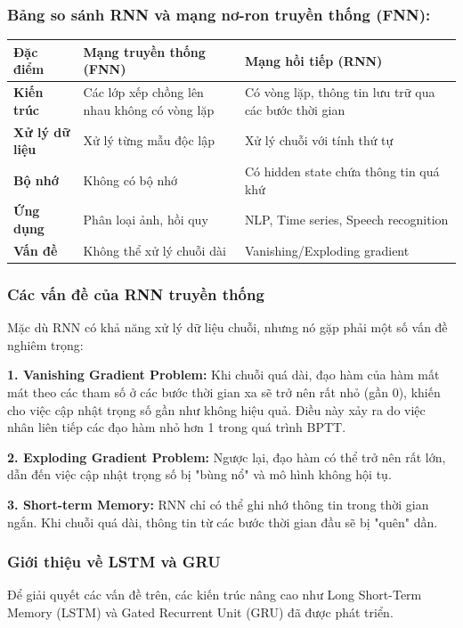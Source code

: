 \subsubsection{Bảng so sánh RNN và mạng nơ-ron truyền thống (FNN):}

\begin{table}[H]
    \centering
    \begin{tabular}{|p{3cm}|p{5.5cm}|p{5.5cm}|}
        \hline
        \textbf{Đặc điểm} & \textbf{Mạng truyền thống (FNN)} & \textbf{Mạng hồi tiếp (RNN)} \\ \hline        \textbf{Kiến trúc} & Các lớp xếp chồng lên nhau không có vòng lặp & Có vòng lặp, thông tin lưu trữ qua các bước thời gian \\ \hline
        \textbf{Xử lý dữ liệu} & Xử lý từng mẫu độc lập & Xử lý chuỗi với tính thứ tự \\ \hline
        \textbf{Bộ nhớ} & Không có bộ nhớ & Có hidden state chứa thông tin quá khứ \\ \hline
        \textbf{Ứng dụng} & Phân loại ảnh, hồi quy & NLP, Time series, Speech recognition \\ \hline
        \textbf{Vấn đề} & Không thể xử lý chuỗi dài & Vanishing/Exploding gradient \\ \hline
    \end{tabular}
\end{table}

\subsubsection{Các vấn đề của RNN truyền thống}
Mặc dù RNN có khả năng xử lý dữ liệu chuỗi, nhưng nó gặp phải một số vấn đề nghiêm trọng:

\textbf{1. Vanishing Gradient Problem:} Khi chuỗi quá dài, đạo hàm của hàm mất mát theo các tham số ở các bước thời gian xa sẽ trở nên rất nhỏ (gần 0), khiến cho việc cập nhật trọng số gần như không hiệu quả. Điều này xảy ra do việc nhân liên tiếp các đạo hàm nhỏ hơn 1 trong quá trình BPTT.

\textbf{2. Exploding Gradient Problem:} Ngược lại, đạo hàm có thể trở nên rất lớn, dẫn đến việc cập nhật trọng số bị "bùng nổ" và mô hình không hội tụ.

\textbf{3. Short-term Memory:} RNN chỉ có thể ghi nhớ thông tin trong thời gian ngắn. Khi chuỗi quá dài, thông tin từ các bước thời gian đầu sẽ bị "quên" dần.

\subsubsection{Giới thiệu về LSTM và GRU}
Để giải quyết các vấn đề trên, các kiến trúc nâng cao như Long Short-Term Memory (LSTM) và Gated Recurrent Unit (GRU) đã được phát triển.

